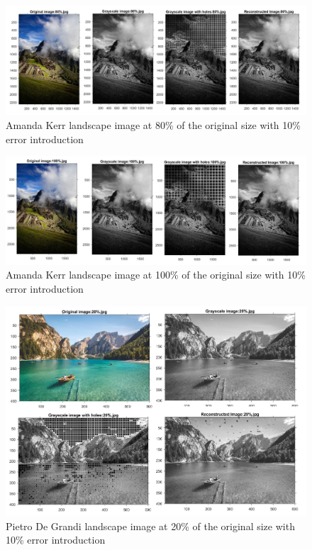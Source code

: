 \begin{figure}[!ht]
\center \includegraphics[scale=0.31]{AmandaKerr80.jpg}
\caption{Amanda Kerr landscape image at 80\% of the original size with 10\% error introduction}
\label{fig:AmandaKerr80}
\end{figure}

\begin{figure}[!ht]
\center \includegraphics[scale=0.31]{AmandaKerr100.jpg}
\caption{Amanda Kerr landscape image at 100\% of the original size with 10\% error introduction}
\label{fig:AmandaKerr100}
\end{figure}


\begin{figure}[!ht]
\center \includegraphics[scale=0.31]{PietroDeGrandi20.jpg}
\caption{Pietro De Grandi landscape image at 20\% of the original size with 10\% error introduction}
\label{fig:PietroDeGrandi20}
\end{figure}

